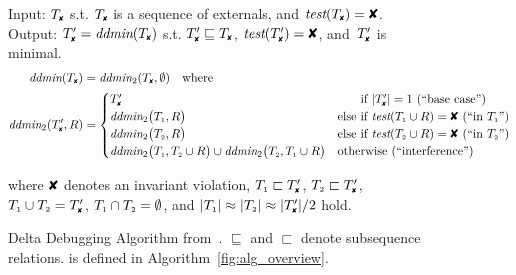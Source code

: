 \begin{figure*}[t!]
\footnotesize
\begin{boxedminipage}{\textwidth}
Input: $\cfail$ s.t. $\cfail$ is a sequence of externals, and $\test(\cfail) = \DFAIL$. Output: $\dfail
= \ddmin(\cfail)$ s.t. $\dfail \sqsubseteq
\cfail$, $\test(\dfail) = \DFAIL$, and~$\dfail$ is minimal.
\begin{align*}
\ddmin(\cfail) &= \ddmin_2(\cfail, \emptyset) \quad \text{where} \\
\ddmin_2(\dfail, R) &=
\begin{cases}
\dfail & \text{\hphantom{else }if $|\dfail| = 1$ (``base case'')} \\
\ddmin_2\bigl(\done, R\bigr) &
\text{else if $\test(\done \cup R) = \DFAIL$ (``in $\done$'')} \\
\ddmin_2\bigl(\dtwo, R\bigr) &
\text{else if $\test(\dtwo \cup R) = \DFAIL$ (``in $\dtwo$'')} \\
\ddmin_2\bigl(\done, \dtwo \cup R\bigr) \cup \ddmin_2\bigl(\dtwo, \done \cup
R\bigr) & \text{otherwise (``interference'')}
\end{cases}
\end{align*}
\begin{center}
where $\DFAIL$ denotes an invariant violation,
$\done \sqsubset \dfail$, $\dtwo \sqsubset \dfail$, $\done \cup \dtwo = \dfail$, ${T_{\scriptscriptstyle 1}} \cap
{T_{\scriptscriptstyle 2}} = \emptyset$, and $|\done| \approx |\dtwo| \approx |\dfail| / 2$
hold.
\end{center}
\end{boxedminipage}
\caption{Delta Debugging Algorithm
from~\cite{Zeller:1999:YMP:318773.318946}. $\sqsubseteq$ and $\sqsubset$ denote
subsequence relations.  is defined in Algorithm~\ref{fig:alg_overview}.}
\label{fig:ddmin}
\end{figure*}

